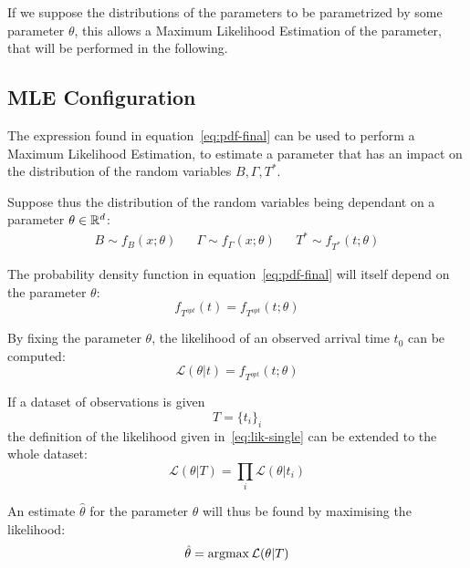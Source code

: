 If we suppose the distributions of the parameters to be parametrized by some parameter \(\theta\),
this allows a Maximum Likelihood Estimation of the parameter,
that will be performed in the following.

\subsection{MLE Configuration}

The expression found in equation~\eqref{eq:pdf-final} can be used to perform a Maximum Likelihood Estimation,
to estimate a parameter that has an impact on the distribution of the random variables \(B, \Gamma, T^*\).

Suppose thus the distribution of the random variables being dependant on a parameter \(\theta \in \mathbb{R}^d\):
\begin{align*}
  B \sim f_B(x; \theta) && \Gamma \sim f_\Gamma(x; \theta) && T^* \sim f_{T^*}(t; \theta)
\end{align*}

The probability density function in equation~\eqref{eq:pdf-final} will itself depend on the parameter \(\theta\):
\begin{equation*}
  f_{T^{opt}}(t) = f_{T^{opt}}(t; \theta)
\end{equation*}

By fixing the parameter \(\theta\),
the likelihood of an observed arrival time \(t_0\) can be computed:
\begin{equation}
  \label{eq:lik-single}
  \mathcal{L}(\theta | t) = f_{T^{opt}}(t; \theta)
\end{equation}

If a dataset of observations is given
\begin{equation*}
  T = \{t_i\}_i
\end{equation*}
the definition of the likelihood given in~\eqref{eq:lik-single} can be extended to the whole dataset:
\begin{equation}
  \label{eq:lik-final}
  \mathcal{L}(\theta | T) = \prod_i \mathcal{L}(\theta | t_i)
\end{equation}

An estimate \(\hat{\theta}\) for the parameter \(\theta\) will thus be found by maximising the likelihood:
\begin{equation}
  \label{eq:max-lik}
  \hat{\theta} = \operatorname*{argmax} \mathcal{L}(\theta | T)
\end{equation}

